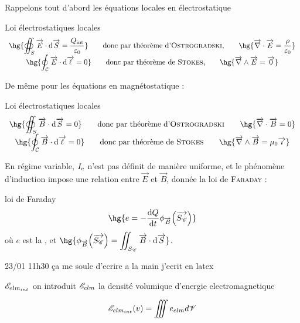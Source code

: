 \documentclass[a4paper,french,bookmarks]{book}
\begin{document}
    Rappelons tout d'abord les équations locales en électrostatique
    \begin{form}{Loi électrostatiques locales}{}
        \[ \begin{array}{c}
            \displaystyle\hg{\oiint_S \vec E \cdot \dif \vec S = \dfrac{Q_\text{int}}{\epsilon_0}} \qquad\text{donc par théorème d'\textsc{Ostrogradski},}\qquad \hg{\vec \nabla \cdot \vec E = \dfrac{\rho}{\epsilon_0}}\\
            \displaystyle \hg{\oint_\bcC \vec E \cdot \dif \vec{\ell} = 0} \qquad\text{donc par théorème de \textsc{Stokes},}\qquad \hg{\vec \nabla \wedge \vec E = \vec 0}
        \end{array} \]
    \end{form}
    De même pour les équations en magnétostatique :
    \begin{form}{Loi électrostatiques locales}{}
        \[ \begin{array}{c}
            \displaystyle \hg{\oiint_S \vec B \cdot \dif \vec S = 0} \qquad\text{donc par théorème d'\textsc{Ostrogradski}}\qquad \hg{\vec \nabla \cdot \vec B = 0}\\
            \displaystyle \hg{\oint_\bcC \vec B \cdot \dif \vec{\ell} = 0} \qquad\text{donc par théorème de \textsc{Stokes}}\qquad \hg{\vec \nabla \wedge \vec B = \mu_0 \vec \imath }
        \end{array} \]
    \end{form}
    En régime variable, $I_\text e$ n'est pas définit de manière uniforme, et le phénomène d'induction impose une relation entre $\vec E$ et $\vec B$, donnée la loi de \textsc{Faraday} :
    \begin{form}{loi de Faraday}{}
        \[ \hg{e = -\dfrac{\dif Q}{\dif t}\phi_{\vec B}\p{\vec{S_\bsC}}}\]
        où $e$ est la , et $\hg{\phi_{\vec B}\p{\vec{S_\bsC}} = \displaystyle\niint_{S_\bsC} \vec B \cdot \dif \vec S}$.
    \end{form}
    
    
    
    
    23/01 11h30 ça me soule d'ecrire a la main j'ecrit en latex 
    
    
    \begin{definition}{$\mathscr{E}_{elm_{int}}$}{}
    on introduit $\mathscr{E}_{elm}$ la densité volumique d'energie electromagnetique
    
    \[ \mathscr{E}_{elm_{int}}(v) = \iiint e_{elm}d\mathscr{V}  \]
    \end{definition}
    
\end{document}
